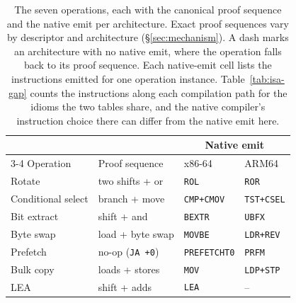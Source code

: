 \begin{table}[t]
\centering
\small
\caption{The seven \lang operations, each with the canonical proof sequence and the native emit per architecture. Exact proof sequences vary by descriptor and architecture (\S\ref{sec:mechanism}). A dash marks an architecture with no native emit, where the operation falls back to its proof sequence. Each native-emit cell lists the instructions emitted for one operation instance. Table~\ref{tab:isa-gap} counts the instructions along each compilation path for the idioms the two tables share, and the native compiler's instruction choice there can differ from the native emit here.}
\label{tab:descriptors}
\begin{tabular}{@{}llll@{}}
\toprule
 & & \multicolumn{2}{c}{Native emit} \\
\cmidrule(lr){3-4}
Operation & Proof sequence & x86-64 & ARM64 \\
\midrule
Rotate & two shifts + or & \texttt{ROL} & \texttt{ROR} \\
Conditional select & branch + move & \texttt{CMP+CMOV} & \texttt{TST+CSEL} \\
Bit extract & shift + and & \texttt{BEXTR} & \texttt{UBFX} \\
Byte swap & load + byte swap & \texttt{MOVBE} & \texttt{LDR+REV} \\
Prefetch & no-op (\texttt{JA +0}) & \texttt{PREFETCHT0} & \texttt{PRFM} \\
Bulk copy & loads + stores & \texttt{MOV} & \texttt{LDP+STP} \\
LEA & shift + adds & \texttt{LEA} & -- \\
\bottomrule
\end{tabular}
\end{table}
